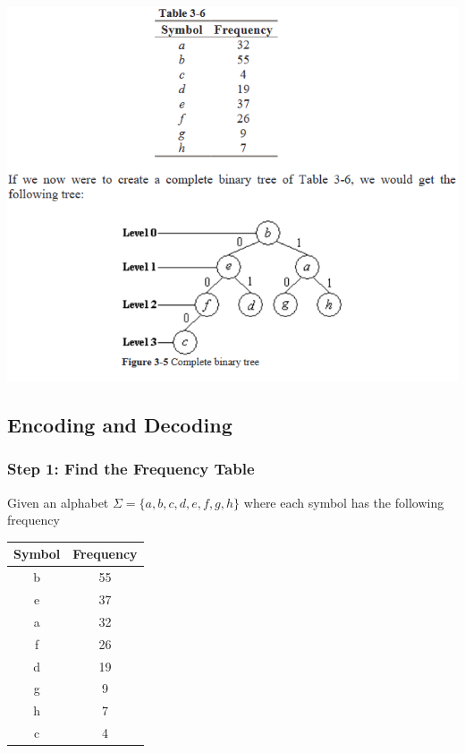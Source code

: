 \documentclass{beamer}
\begin{document}
\begin{frame}
\begin{center}
\includegraphics[scale=0.55]{example}
\end{center}
\end{frame}

\subsection{Encoding and Decoding}
\begin{frame}
    \frametitle{Step 1: Find the Frequency Table}
    Given an alphabet $\Sigma =\{a, b, c, d, e, f, g, h\}$ where each symbol has the following frequency\\
    \begin{center}
        \begin{tabular}{ |c|c| } 
            \hline
            Symbol & Frequency \\ 
            \hline
            b & 55 \\
            e & 37 \\
            a & 32 \\ 
            f & 26 \\
            d & 19 \\
            g & 9 \\
            h & 7 \\ 
            c & 4 \\ 
            \hline
        \end{tabular}    
    \end{center}
\end{frame}
\end{document}

